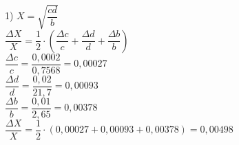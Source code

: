 \documentclass[a4paper, 12pt]{article}
\begin{document}
	1) $X = \sqrt{\dfrac{cd}{b}}$\\
	$\dfrac{\varDelta X}{X} = \dfrac{1}{2} \cdot \left( \dfrac{\varDelta c}{c} + \dfrac{\varDelta d}{d} + \dfrac{\varDelta b}{b} \right)$\\
	$\dfrac{\varDelta c}{c} = \dfrac{0,0002}{0,7568} = 0,00027$\\
	$\dfrac{\varDelta d}{d} = \dfrac{0,02}{21,7} = 0,00093$\\
	$\dfrac{\varDelta b}{b} = \dfrac{0,01}{2,65} = 0,00378$\\
	$\dfrac{\varDelta X}{X} = \dfrac{1}{2} \cdot \left( 0,00027 + 0,00093 + 0,00378 \right) = 0,00498$
\end{document}
